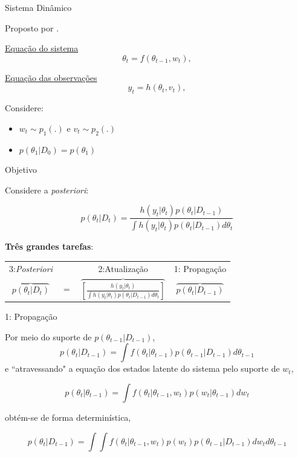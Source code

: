 \documentclass{beamer}
\begin{document}
\begin{frame}{Sistema Dinâmico}

Proposto por \cite{gordon}.

\vspace{0.5cm}

\underline{Equação do sistema}
$$\theta_t = f(\theta_{t-1},w_t),$$

\pause

\underline{Equação das observações}
$$y_t = h(\theta_{t} , v_t),$$

\pause

Considere:
\begin{itemize}
\item $w_t \sim p_1(.)$ e $v_t\sim p_2(.)$
\item $p(\theta_1|D_0)=p(\theta_1)$
\end{itemize}

\end{frame}


\begin{frame}{Objetivo}

Considere a \textit{posteriori}:

\vspace{0.5cm}

$$
p(\theta_t|D_t)  = \frac{h(y_t|\theta_t)  p(\theta_t|D_{t-1}) }{\int h(y_t|\theta_t)p(\theta_t|D_{t-1})d \theta_t}
$$

\pause

\textbf{Três grandes tarefas}:
\vspace{0.5cm}

\begin{tabular}{cccc}
3:\textit{Posteriori} & & 2:Atualização & 1: Propagação \\
$\overbrace{p(\theta_t|D_t)} $ & $=$ & $\overbrace{\left[\frac{h(y_t|\theta_t)}{\int h(y_t|\theta_t)p(\theta_t|D_{t-1})d \theta_t}\right]} $& $\overbrace{p(\theta_t|D_{t-1})}$
\end{tabular}

\end{frame}



\begin{frame}{1: Propagação}

Por meio do suporte de $p(\theta_{t-1}|D_{t-1})$,
$$
p(\theta_t|D_{t-1}) = \int f(\theta_t|\theta_{t-1})p(\theta_{t-1}|D_{t-1})d\theta_{t-1}
$$
\pause
e ``atravessando" a equação dos estados latente do sistema pelo suporte de $w_t$, 

$$
p(\theta_t|\theta_{t-1}) = \int f(\theta_t|\theta_{t-1},w_{t})p(w_{t}|\theta_{t-1})dw_{t}
$$
\pause

obtém-se de forma determinística,

$$
p(\theta_t|D_{t-1}) = \int \int f(\theta_t|\theta_{t-1},w_{t})p(w_{t})p(\theta_{t-1}|D_{t-1})dw_{t}d\theta_{t-1}
$$


\end{frame}
\end{document}
